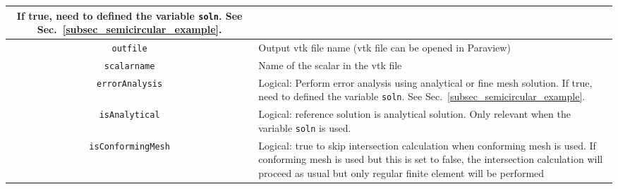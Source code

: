 \documentclass[11pt,letterpaper]{article}
\begin{document}
\begin{table}[!h]
\begin{tabular}{|c|L|}
If true, need to defined the variable \texttt{soln}. See Sec.\ \ref{subsec_semicircular_example}. \\
\hline 
\texttt{outfile} & Output vtk file name (vtk file can be opened in Paraview) \\
\hline
\texttt{scalarname} & Name of the scalar in the vtk file \\
\hline
\texttt{errorAnalysis} & Logical: Perform error analysis using analytical or fine mesh solution.
If true, need to defined the variable \texttt{soln}. See Sec.\ \ref{subsec_semicircular_example}.  \\
\hline
\texttt{isAnalytical} & Logical: reference solution is analytical solution. Only relevant when the variable \texttt{soln} is used.\\
\hline
\texttt{isConformingMesh} & Logical: true to skip intersection calculation when conforming mesh is used. 
If conforming mesh is used but this is set to false, the intersection calculation will proceed as usual but only
regular finite element will be performed \\
\hline
\end{tabular}
\end{table}
\end{document}
